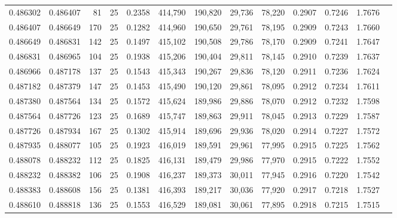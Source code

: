 \begin{tabular}{rrrrrrrrrrrrr}
0.486302 & 0.486407 &    81 &  25 &                                     0.2358 & 414,790 & 190,820 &  29,736 &  78,220 & 0.2907 & 0.7246 & 1.7676 \\
0.486407 & 0.486649 &   170 &  25 &                                     0.1282 & 414,960 & 190,650 &  29,761 &  78,195 & 0.2909 & 0.7243 & 1.7660 \\
0.486649 & 0.486831 &   142 &  25 &                                     0.1497 & 415,102 & 190,508 &  29,786 &  78,170 & 0.2909 & 0.7241 & 1.7647 \\
0.486831 & 0.486965 &   104 &  25 &                                     0.1938 & 415,206 & 190,404 &  29,811 &  78,145 & 0.2910 & 0.7239 & 1.7637 \\
0.486966 & 0.487178 &   137 &  25 &                                     0.1543 & 415,343 & 190,267 &  29,836 &  78,120 & 0.2911 & 0.7236 & 1.7624 \\
0.487182 & 0.487379 &   147 &  25 &                                     0.1453 & 415,490 & 190,120 &  29,861 &  78,095 & 0.2912 & 0.7234 & 1.7611 \\
0.487380 & 0.487564 &   134 &  25 &                                     0.1572 & 415,624 & 189,986 &  29,886 &  78,070 & 0.2912 & 0.7232 & 1.7598 \\
0.487564 & 0.487726 &   123 &  25 &                                     0.1689 & 415,747 & 189,863 &  29,911 &  78,045 & 0.2913 & 0.7229 & 1.7587 \\
0.487726 & 0.487934 &   167 &  25 &                                     0.1302 & 415,914 & 189,696 &  29,936 &  78,020 & 0.2914 & 0.7227 & 1.7572 \\
0.487935 & 0.488077 &   105 &  25 &                                     0.1923 & 416,019 & 189,591 &  29,961 &  77,995 & 0.2915 & 0.7225 & 1.7562 \\
0.488078 & 0.488232 &   112 &  25 &                                     0.1825 & 416,131 & 189,479 &  29,986 &  77,970 & 0.2915 & 0.7222 & 1.7552 \\
0.488232 & 0.488382 &   106 &  25 &                                     0.1908 & 416,237 & 189,373 &  30,011 &  77,945 & 0.2916 & 0.7220 & 1.7542 \\
0.488383 & 0.488608 &   156 &  25 &                                     0.1381 & 416,393 & 189,217 &  30,036 &  77,920 & 0.2917 & 0.7218 & 1.7527 \\
0.488610 & 0.488818 &   136 &  25 &                                     0.1553 & 416,529 & 189,081 &  30,061 &  77,895 & 0.2918 & 0.7215 & 1.7515 \\

\end{tabular}
